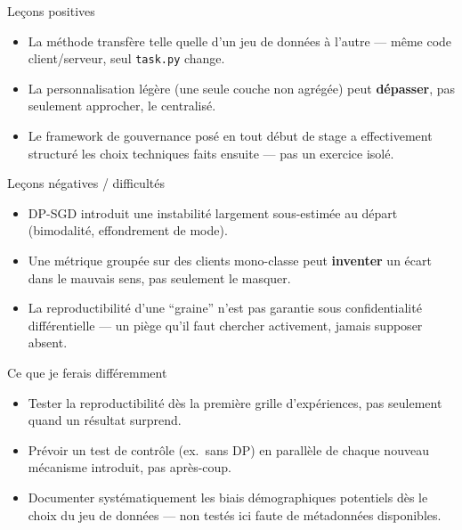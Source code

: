 \documentclass[aspectratio=169,11pt]{beamer}
\begin{document}
\begin{frame}{Leçons positives}
  \begin{itemize}
    \item La méthode transfère telle quelle d'un jeu de données à l'autre
      --- même code client/serveur, seul \texttt{task.py} change.
    \item La personnalisation légère (une seule couche non agrégée) peut
      \textbf{dépasser}, pas seulement approcher, le centralisé.
    \item Le framework de gouvernance posé en tout début de stage a
      effectivement structuré les choix techniques faits ensuite ---
      pas un exercice isolé.
  \end{itemize}
\end{frame}

\begin{frame}{Leçons négatives / difficultés}
  \begin{itemize}
    \item DP-SGD introduit une instabilité largement sous-estimée au
      départ (bimodalité, effondrement de mode).
    \item Une métrique groupée sur des clients mono-classe peut
      \textbf{inventer} un écart dans le mauvais sens, pas seulement le
      masquer.
    \item La reproductibilité d'une ``graine'' n'est pas garantie sous
      confidentialité différentielle --- un piège qu'il faut chercher
      activement, jamais supposer absent.
  \end{itemize}
\end{frame}

\begin{frame}{Ce que je ferais différemment}
  \begin{itemize}
    \item Tester la reproductibilité dès la première grille d'expériences,
      pas seulement quand un résultat surprend.
    \item Prévoir un test de contrôle (ex.\ sans DP) en parallèle de chaque
      nouveau mécanisme introduit, pas après-coup.
    \item Documenter systématiquement les biais démographiques potentiels
      dès le choix du jeu de données --- non testés ici faute de métadonnées
      disponibles.
  \end{itemize}
\end{frame}

\end{document}
